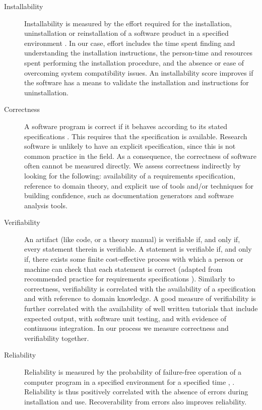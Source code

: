 \documentclass[final, 3p, times, authoryear]{elsarticle}
\begin{document}
\begin{description}

	\item[Installability] Installability is measured by the effort required for
	the installation, uninstallation or reinstallation of a software product in
	a specified environment \citep{ISO/IEC25010, lenhard2013measuring}. In our
	case, effort includes the time spent finding and understanding the
	installation instructions, the person-time and resources spent performing
	the installation procedure, and the absence or ease of overcoming system
	compatibility issues. An installability score improves if the software has a
	means to validate the installation and instructions for uninstallation.
	
	\item[Correctness] A software program is correct if it behaves according to
	its stated specifications \citep[p.\ 17]{GhezziEtAl2003}. This requires that
	the specification is available. Research software is unlikely to have an
	explicit specification, since this is not common practice in the field. As a
	consequence, the correctness of software often cannot be measured directly.
	We assess correctness indirectly by looking for the following: availability
	of a requirements specification, reference to domain theory, and explicit
	use of tools and/or techniques for building confidence, such as
	documentation generators and software analysis tools.
	
	\item[Verifiability] An artifact (like code, or a theory manual) is
	verifiable if, and only if, every statement therein is verifiable. A
	statement is verifiable if, and only if, there exists some finite
	cost-effective process with which a person or machine can check that each
	statement is correct (adapted from recommended practice for requirements
	specifications \citep{IEEE1998}). Similarly to correctness, verifiability is
	correlated with the availability of a specification and with reference to
	domain knowledge. A good measure of verifiability is further correlated with
	the availability of well written tutorials that include expected output,
	with software unit testing, and with evidence of continuous integration. In
	our process we measure correctness and verifiability together.
	
	\item[Reliability] Reliability is measured by the probability of
	failure-free operation of a computer program in a specified environment for
	a specified time \citep[p.\ 357]{GhezziEtAl2003}, \citep{musa1987software}.
	Reliability is thus positively correlated with the absence of errors during
	installation and use. Recoverability from errors also improves reliability.
	

\end{description}
\end{document}
